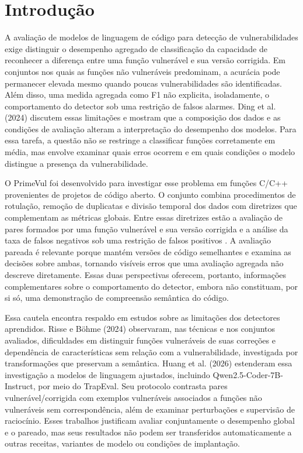 \section{Introdução}
\label{sec:introducao}

A avaliação de modelos de linguagem de código para detecção de vulnerabilidades exige distinguir o desempenho agregado de classificação da capacidade de reconhecer a diferença entre uma função vulnerável e sua versão corrigida. Em conjuntos nos quais as funções não vulneráveis predominam, a acurácia pode permanecer elevada mesmo quando poucas vulnerabilidades são identificadas. Além disso, uma medida agregada como F1 não explicita, isoladamente, o comportamento do detector sob uma restrição de falsos alarmes. Ding et al. (2024) discutem essas limitações e mostram que a composição dos dados e as condições de avaliação alteram a interpretação do desempenho dos modelos. Para essa tarefa, a questão não se restringe a classificar funções corretamente em média, mas envolve examinar quais erros ocorrem e em quais condições o modelo distingue a presença da vulnerabilidade.

O PrimeVul foi desenvolvido para investigar esse problema em funções C/C++ provenientes de projetos de código aberto. O conjunto combina procedimentos de rotulação, remoção de duplicatas e divisão temporal dos dados com diretrizes que complementam as métricas globais. Entre essas diretrizes estão a avaliação de pares formados por uma função vulnerável e sua versão corrigida e a análise da taxa de falsos negativos sob uma restrição de falsos positivos \cite{ding2024primevul}. A avaliação pareada é relevante porque mantém versões de código semelhantes e examina as decisões sobre ambas, tornando visíveis erros que uma avaliação agregada não descreve diretamente. Essas duas perspectivas oferecem, portanto, informações complementares sobre o comportamento do detector, embora não constituam, por si só, uma demonstração de compreensão semântica do código.

Essa cautela encontra respaldo em estudos sobre as limitações dos detectores aprendidos. Risse e Böhme (2024) observaram, nas técnicas e nos conjuntos avaliados, dificuldades em distinguir funções vulneráveis de suas correções e dependência de características sem relação com a vulnerabilidade, investigada por transformações que preservam a semântica. Huang et al. (2026) estenderam essa investigação a modelos de linguagem ajustados, incluindo Qwen2.5-Coder-7B-Instruct, por meio do TrapEval. Seu protocolo contrasta pares vulnerável/corrigida com exemplos vulneráveis associados a funções não vulneráveis sem correspondência, além de examinar perturbações e supervisão de raciocínio. Esses trabalhos justificam avaliar conjuntamente o desempenho global e o pareado, mas seus resultados não podem ser transferidos automaticamente a outras receitas, variantes de modelo ou condições de implantação.

